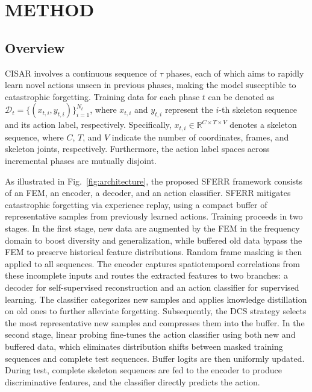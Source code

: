 \documentclass[journal]{IEEEtran}
\begin{document}
\section{METHOD}
\subsection{Overview}
CISAR involves a continuous sequence of $\tau$ phases, each of which aims to rapidly learn novel actions unseen in previous phases, making the model susceptible to catastrophic forgetting.
Training data for each phase $t$ can be denoted as $\mathcal{D}_t = \{(x_{t,i}, y_{t,i})\}_{i=1}^{N_t}$, where $x_{t,i}$ and $y_{t,i}$ represent the $i$-th skeleton sequence and its action label, respectively. Specifically, $x_{t,i} \in \mathbb{R}^{C \times T \times V}$ denotes a skeleton sequence, where $C$, $T$, and $V$ indicate the number of coordinates, frames, and skeleton joints, respectively.
Furthermore, the action label spaces across incremental phases are mutually disjoint.

As illustrated in Fig.~\ref{fig:architecture}, the proposed SFERR framework consists of an FEM, an encoder, a decoder, and an action classifier.
SFERR mitigates catastrophic forgetting via experience replay, using a compact buffer of representative samples from previously learned actions.
Training proceeds in two stages.
In the first stage, new data are augmented by the FEM in the frequency domain to boost diversity and generalization, while buffered old data bypass the FEM to preserve historical feature distributions. 
Random frame masking is then applied to all sequences. 
The encoder captures spatiotemporal correlations from these incomplete inputs and routes the extracted features to two branches: a decoder for self-supervised reconstruction and an action classifier for supervised learning. 
The classifier categorizes new samples and applies knowledge distillation on old ones to further alleviate forgetting.
Subsequently, the DCS strategy selects the most representative new samples and compresses them into the buffer.
In the second stage, linear probing fine-tunes the action classifier using both new and buffered data, which eliminates distribution shifts between masked training sequences and complete test sequences.
Buffer logits are then uniformly updated.
During test, complete skeleton sequences are fed to the encoder to produce discriminative features, and the classifier directly predicts the action.
\end{document}
